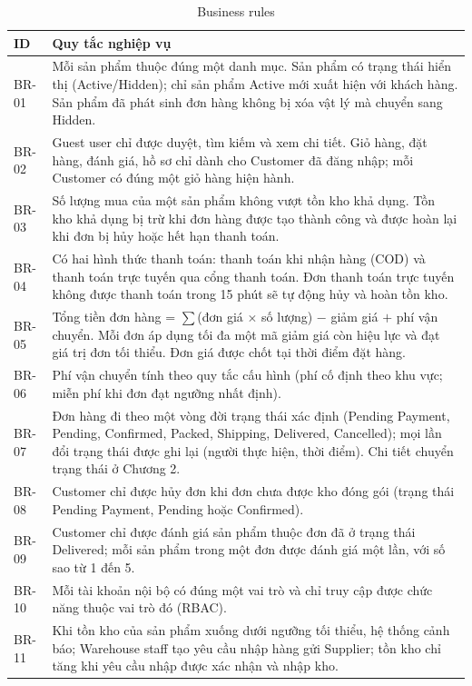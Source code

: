 \documentclass[12pt,a4paper,oneside]{report}
\begin{document}
\begin{longtable}{p{1.4cm}p{14.4cm}}
\caption{Business rules}\\
\toprule
\textbf{ID} & \textbf{Quy tắc nghiệp vụ} \\
\midrule
\endhead
\bottomrule
\endlastfoot
BR-01 & Mỗi sản phẩm thuộc đúng một danh mục. Sản phẩm có trạng thái hiển thị (Active/Hidden); chỉ sản phẩm Active mới xuất hiện với khách hàng. Sản phẩm đã phát sinh đơn hàng không bị xóa vật lý mà chuyển sang Hidden. \\
BR-02 & Guest user chỉ được duyệt, tìm kiếm và xem chi tiết. Giỏ hàng, đặt hàng, đánh giá, hồ sơ chỉ dành cho Customer đã đăng nhập; mỗi Customer có đúng một giỏ hàng hiện hành. \\
BR-03 & Số lượng mua của một sản phẩm không vượt tồn kho khả dụng. Tồn kho khả dụng bị trừ khi đơn hàng được tạo thành công và được hoàn lại khi đơn bị hủy hoặc hết hạn thanh toán. \\
BR-04 & Có hai hình thức thanh toán: thanh toán khi nhận hàng (COD) và thanh toán trực tuyến qua cổng thanh toán. Đơn thanh toán trực tuyến không được thanh toán trong 15 phút sẽ tự động hủy và hoàn tồn kho. \\
BR-05 & Tổng tiền đơn hàng = $\sum$(đơn giá $\times$ số lượng) $-$ giảm giá $+$ phí vận chuyển. Mỗi đơn áp dụng tối đa một mã giảm giá còn hiệu lực và đạt giá trị đơn tối thiểu. Đơn giá được chốt tại thời điểm đặt hàng. \\
BR-06 & Phí vận chuyển tính theo quy tắc cấu hình (phí cố định theo khu vực; miễn phí khi đơn đạt ngưỡng nhất định). \\
BR-07 & Đơn hàng đi theo một vòng đời trạng thái xác định (Pending Payment, Pending, Confirmed, Packed, Shipping, Delivered, Cancelled); mọi lần đổi trạng thái được ghi lại (người thực hiện, thời điểm). Chi tiết chuyển trạng thái ở Chương 2. \\
BR-08 & Customer chỉ được hủy đơn khi đơn chưa được kho đóng gói (trạng thái Pending Payment, Pending hoặc Confirmed). \\
BR-09 & Customer chỉ được đánh giá sản phẩm thuộc đơn đã ở trạng thái Delivered; mỗi sản phẩm trong một đơn được đánh giá một lần, với số sao từ 1 đến 5. \\
BR-10 & Mỗi tài khoản nội bộ có đúng một vai trò và chỉ truy cập được chức năng thuộc vai trò đó (RBAC). \\
BR-11 & Khi tồn kho của sản phẩm xuống dưới ngưỡng tối thiểu, hệ thống cảnh báo; Warehouse staff tạo yêu cầu nhập hàng gửi Supplier; tồn kho chỉ tăng khi yêu cầu nhập được xác nhận và nhập kho. \\
\end{longtable}
\end{document}
